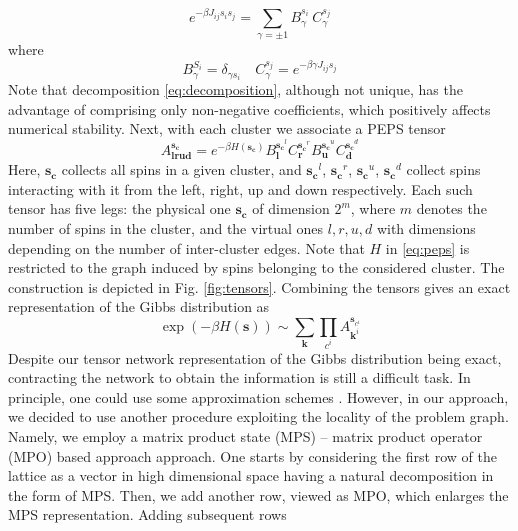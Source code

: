 \begin{equation}
  e^{-\beta J_{ij}s_i s_j} = \sum_{\gamma = \pm 1} B^{s_{i\phantom{j}}}_\gamma C^{s_j}_\gamma
\end{equation}
where
\begin{equation}
  \label{eq:decomposition}
  B^{S_i}_\gamma = \delta_{\gamma s_i} \quad C^{s_j}_\gamma = e^{-\beta \gamma J_{ij} s_j}
\end{equation}
Note that decomposition \eqref{eq:decomposition}, although not unique, has the
advantage of comprising only non-negative coefficients, which positively
affects numerical stability. Next, with each cluster we associate a PEPS tensor
\begin{equation}
  \label{eq:peps}
  A^{\mathbf{s_c}}_{\mathbf{lrud}} = e^{-\beta H(\mathbf{s_c})} B^{\mathbf{s_c}^l}_\mathbf{l}C^{\mathbf{s_c}^r}_\mathbf{r}B^{\mathbf{s_c}^u}_\mathbf{u}C^{\mathbf{s_c}^d}_\mathbf{d}
\end{equation}
Here, $\mathbf{s_c}$ collects all spins in a given cluster, and
$\mathbf{s_c}^l$, $\mathbf{s_c}^r$, $\mathbf{s_c}^u$, $\mathbf{s_c}^d$ collect
spins interacting with it from the left, right, up and down respectively. Each
such tensor has five legs: the physical one $\mathbf{s_c}$ of dimension $2^m$,
where $m$ denotes the number of spins in the cluster, and the virtual ones $l,
  r, u, d$ with dimensions depending on the number of inter-cluster edges. Note
that $H$ in \eqref{eq:peps} is restricted to the graph induced by spins
belonging to the considered cluster. The construction is depicted in Fig.
\ref{fig:tensors}. Combining the tensors gives an exact representation of the
Gibbs distribution as
\begin{equation}
  \exp(-\beta H(\mathbf{s})) \sim \sum_{\mathbf{k}}\prod_{c^{i}}A_{\mathbf{k}^{i}}^{\mathbf{s}_{c^{i}}}
\end{equation}
Despite our tensor network representation of the Gibbs distribution being
exact, contracting the network to obtain the information is still a difficult
task. In principle, one could use some approximation schemes \cite{lewenstein}.
However, in our approach, we decided to use another procedure exploiting the
locality of the problem graph. Namely, we employ a matrix product state (MPS)
-- matrix product operator (MPO) based approach \cite{murg} approach. One starts by
considering the first row of the lattice as a vector in high dimensional space
having a natural decomposition in the form of MPS. Then, we add another row,
viewed as MPO, which enlarges the MPS representation. Adding subsequent rows
